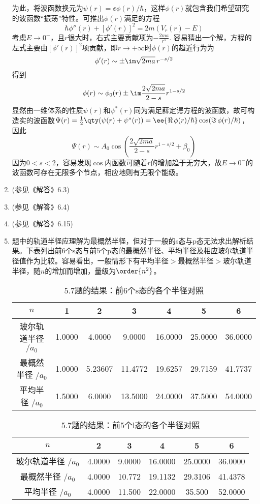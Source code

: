 \begin{enumerate}[label=\textbf{5.\arabic*}, listparindent=\parindent]
为此，将波函数换元为$\psi(r)=\ee{\phi(r)/\hbar}$，这样$\phi(r)$就包含我们希望研究的波函数“振荡”特性。可推出$\phi(r)$满足的方程
\[\hbar \phi''(r)+[\phi'(r)]^2=2m(V_r(r)-E)\]
考虑$E\rightarrow 0^-$，且$r$很大时，右式主要贡献项为$-\frac{2ma}{r^s}$. 容易猜出一个解，方程的左式主要由$[\phi'(r)]^2$项贡献，即$r\rightarrow+\infty$时$\phi(r)$的趋近行为为
\[\phi'(r)\sim \pm \im\sqrt{2ma}\,r^{-s/2}\]
得到
\[\phi(r)\sim \phi_0(r)\pm\im\frac{2\sqrt{2ma}}{2-s}r^{1-s/2}\]
显然由一维体系的性质$\psi(r)$和$\psi^*(r)$同为满足薛定谔方程的波函数，故可构造实的波函数$\Psi(r)=\frac{1}{2}\qty(\psi(r)+\psi^*(r)) = \ee{\Re\,\phi(r)/\hbar}\cos(\Im\,\phi(r)/\hbar)$，因此
\[\Psi(r)\sim A_0\cos(\frac{2\sqrt{2ma}}{2-s}r^{1-s/2}+\beta_0)\]
因为$0<s<2$，容易发现$\cos$内函数可随着$r$的增加趋于无穷大，故$E\rightarrow 0^-$的波函数可存在无限多个节点，相应地则有无限个能级。

\item (参见《解答》6.3)

\item (参见《解答》6.4)

\item (参见《解答》6.15)

\item 题中的轨道半径应理解为最概然半径，但对于一般的s态与p态无法求出解析结果。下表列出前6个s态与前5个p态的最概然半径、平均半径及相应玻尔轨道半径值作为比较。容易看出，一般情形下有平均半径$>$最概然半径$>$玻尔轨道半径，随$n$的增加而增加，量级为$\order{n^2}$。
\begin{table}[H]
        \centering
        \begin{tabular}{c|c|c|c|c|c|c}
            \hline
            $n$ & 1 & 2 & 3 & 4 & 5 & 6 \\\hline
            玻尔轨道半径 $/a_0 $ & 1.0000 & 4.0000 & 9.0000 & 16.0000 & 25.0000 & 36.0000 \\
            最概然半径 $/a_0 $ &1.0000 &  5.23607 & 11.4772 &  19.6257 &  29.7159 & 41.7737 \\
            平均半径 $/a_0 $ & 1.5000 & 6.0000 & 13.5000 &  24.0000 & 37.5000 & 54.0000\\\hline
        \end{tabular}
        \caption{5.7题的结果：前6个s态的各个半径对照}
        \label{tab:my_label}
    \end{table}
\begin{table}[H]
        \centering
        \begin{tabular}{c|c|c|c|c|c}
            \hline
            $n$ &  2 & 3 & 4 & 5 & 6 \\\hline
            玻尔轨道半径 $/a_0 $ & 4.0000 & 9.0000 & 16.0000 & 25.0000 & 36.0000 \\
            最概然半径 $/a_0 $ & 4.0000 & 10.772 & 19.1132 & 29.3106 & 41.4378 \\
            平均半径 $/a_0 $ & 4.0000 &  11.500 &  22.0000 & 35.500 & 52.0000\\\hline
        \end{tabular}
        \caption{5.7题的结果：前5个l态的各个半径对照}
        \label{tab:my_label}
    \end{table}


\end{enumerate}
